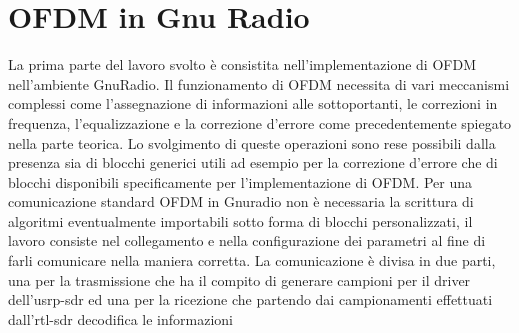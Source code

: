\chapter{OFDM in Gnu Radio}
\label{cha:789}
La prima parte del lavoro svolto è consistita nell'implementazione di OFDM nell'ambiente GnuRadio. Il funzionamento di OFDM necessita di vari meccanismi complessi come l'assegnazione di informazioni alle sottoportanti, le correzioni in frequenza, l'equalizzazione e la correzione d'errore come precedentemente spiegato nella parte teorica. Lo svolgimento di queste operazioni sono rese possibili dalla presenza sia di blocchi generici utili ad esempio per la correzione d'errore che di blocchi disponibili specificamente per l'implementazione di OFDM. Per una comunicazione standard OFDM in Gnuradio non è necessaria la scrittura di algoritmi eventualmente importabili sotto forma di blocchi personalizzati, il lavoro consiste nel collegamento e nella configurazione dei parametri al fine di farli comunicare nella maniera corretta.
La comunicazione è divisa in due parti, una per la trasmissione che ha il compito di generare campioni per il driver dell'usrp-sdr ed una per la ricezione che partendo dai campionamenti effettuati dall'rtl-sdr decodifica le informazioni



